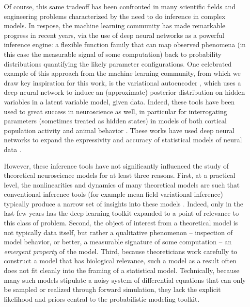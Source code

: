 \documentclass[11pt]{article}
\begin{document}
Of course, this same tradeoff has been confronted in many scientific fields and engineering problems characterized by the need to do inference in complex models.  
In respose, the machine learning community has made remarkable progress in recent years, via the use of deep neural networks as a powerful inference engine: a flexible function family that can map observed phenomena (in this case the measurable signal of some computation) back to probability distributions quantifying the likely parameter configurations.  
One celebrated example of this approach from the machine learning community, from which we draw key inspiration for this work, is the variational autoencoder \cite{kingma2013auto, rezende2014stochastic}, which uses a deep neural network to induce an (approximate) posterior distribution on hidden variables in a latent variable model, given data. 
Indeed, these tools have been used to great success in neuroscience as well, in particular for interrogating parameters (sometimes treated as hidden states) in models of both cortical population activity \cite{gao2016linear, zhao2017recursive, barello2018sparse, pandarinath2018inferring} and animal behavior \cite{wiltschko2015mapping, johnson2016composing, batty2019behavenet}. 
These works have used deep neural networks to expand the expressivity and accuracy of statistical models of neural data \cite{paninski2018neural}. 

However, these inference tools have not significantly influenced the study of theoretical neuroscience models for at least three reasons.  
First, at a practical level, the nonlinearities and dynamics of many theoretical models are such that conventional inference tools (for example mean field variational inference) typically produce a narrow set of insights into these models \cite{blei2017variational}.  
Indeed, only in the last few years has the deep learning toolkit expanded to a point of relevance to this class of problem.
Second, the object of interest from a theoretical model is not typically data itself, but rather a qualitative phenomenon -- inspection of model behavior, or better, a measurable signature of some computation -- an \emph{emergent property} of the model.  
Third, because theoreticians work carefully to construct a model that has biological relevance, such a model as a result often does not fit cleanly into the framing of a statistical model.  
Technically, because many such models stipulate a noisy system of differential equations that can only be sampled or realized through forward simulation, they lack the explicit likelihood and priors central to the probabilistic modeling toolkit.  
\end{document}
